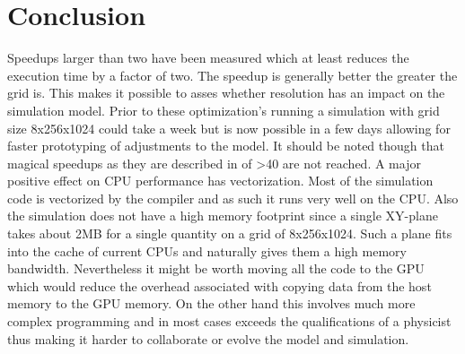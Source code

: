\documentclass[master.tex]{subfiles}
\begin{document}
\section{Conclusion}
Speedups larger than two have been measured which at least reduces the execution time by a factor of two. The speedup is generally better the greater the grid is. This makes it possible to asses whether resolution has an impact on the simulation model. Prior to these optimization's running a simulation with grid size 8x256x1024 could take a week but is now possible in a few days allowing for faster prototyping of adjustments to the model. It should be noted though that magical speedups as they are described in \cite{CUDARedBlack} of >40 are not reached. A major positive effect on CPU performance has vectorization. Most of the simulation code is vectorized by the compiler and as such it runs very well on the CPU. Also the simulation does not have a high memory footprint since a single XY-plane takes about 2MB for a single quantity on a grid of 8x256x1024. Such a plane fits into the cache of current CPUs and naturally gives them a high memory bandwidth. Nevertheless it might be worth moving all the code to the GPU which would reduce the overhead associated with copying data from the host memory to the GPU memory. On the other hand this involves much more complex programming and in most cases exceeds the qualifications of a physicist thus making it harder to collaborate or evolve the model and simulation.
\end{document}
